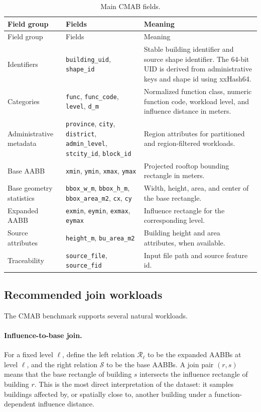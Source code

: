 \documentclass[11pt]{article}
\newcommand{\code}[1]{\ifmmode\text{\ttfamily #1}\else\texttt{#1}\fi}
\newcommand{\Rrel}{\mathcal R}
\newcommand{\Srel}{\mathcal S}
\newcommand{\cmab}{\textsc{CMAB}}
\begin{document}
\begin{longtable}{@{}p{}p{}p{}@{}}
\caption{Main \cmab{} fields.}\label{tab:cmab-schema}\\
\toprule
Field group & Fields & Meaning \\
\midrule
\endfirsthead
\toprule
Field group & Fields & Meaning \\
\midrule
\endhead
Identifiers & \code{building\_uid}, \code{shape\_id} & Stable building identifier and source shape identifier.  The 64-bit UID is derived from administrative keys and shape id using xxHash64. \\
Categories & \code{func}, \code{func\_code}, \code{level}, \code{d\_m} & Normalized function class, numeric function code, workload level, and influence distance in meters. \\
Administrative metadata & \code{province}, \code{city}, \code{district}, \code{admin\_level}, \code{stcity\_id}, \code{block\_id} & Region attributes for partitioned and region-filtered workloads. \\
Base AABB & \code{xmin}, \code{ymin}, \code{xmax}, \code{ymax} & Projected rooftop bounding rectangle in meters. \\
Base geometry statistics & \code{bbox\_w\_m}, \code{bbox\_h\_m}, \code{bbox\_area\_m2}, \code{cx}, \code{cy} & Width, height, area, and center of the base rectangle. \\
Expanded AABB & \code{exmin}, \code{eymin}, \code{exmax}, \code{eymax} & Influence rectangle for the corresponding level. \\
Source attributes & \code{height\_m}, \code{bu\_area\_m2} & Building height and area attributes, when available. \\
Traceability & \code{source\_file}, \code{source\_fid} & Input file path and source feature id. \\
\bottomrule
\end{longtable}

\subsection{Recommended join workloads}
\label{subsec:cmab-workloads}

The \cmab{} benchmark supports several natural workloads.

\paragraph{Influence-to-base join.}
For a fixed level $\ell$, define the left relation $\Rrel_\ell$ to be the expanded AABBs at level $\ell$, and the right relation $\Srel$ to be the base AABBs.  A join pair $(r,s)$ means that the base rectangle of building $s$ intersects the influence rectangle of building $r$.  This is the most direct interpretation of the dataset: it samples buildings affected by, or spatially close to, another building under a function-dependent influence distance.
\end{document}
